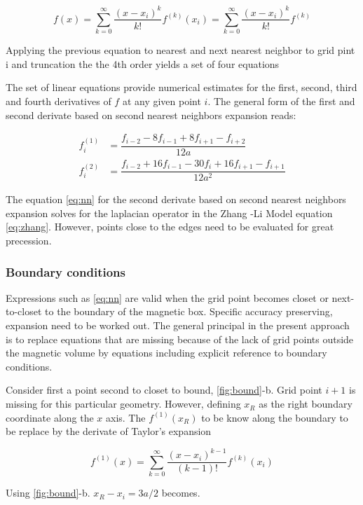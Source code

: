 $$f(x) = \sum\limits_{k=0}^{\infty} \dfrac{(x-x_i)^k}{k!}f^{(k)}(x_i) = \sum\limits_{k=0}^{\infty} \dfrac{(x-x_i)^k}{k!}f^{(k)}$$

Applying the previous equation to nearest and next nearest neighbor to grid pint i and truncation the the 4th order yields a set of four equations

The set of linear equations provide numerical estimates for the first, second, third and fourth derivatives of $f$ at any given point $i$. The general form of the first and second derivate based on second nearest neighbors expansion reads:

\begin{align} \label{eq:nn}
f^{(1)}_i &= \dfrac{f_{i-2}-8f_{i-1} + 8f_{i+1} - f_{i+2}}{12a} \\
f^{(2)}_i &= \dfrac{f_{i-2}+16f_{i-1} -30f_{i} + 16f_{i+1} - f_{i+1}}{12a^2}
\end{align}

The equation \ref{eq:nn} for the second derivate based on second nearest neighbors expansion solves for the laplacian operator in the Zhang -Li Model equation \ref{eq:zhang}. However, points close to the edges need to be evaluated for great precession. 

\subsubsection{Boundary conditions}

Expressions such as \ref{eq:nn} are valid when the grid point becomes closet or next-to-closet to the boundary of the magnetic box. Specific accuracy preserving, expansion need to be worked out. The general principal in the present approach is to replace equations that are missing because of the lack of grid points outside the magnetic volume by equations including explicit reference to boundary conditions. \cite{methods}

Consider first a point second to closet to bound, \ref{fig:bound}-b. Grid point $i + 1$ is missing for this particular geometry. However, defining $x_R$ as the right boundary coordinate along the $x$ axis. The $f^{(1)}(x_R)$ to be know along the boundary to be replace by the derivate of Taylor's expansion

\begin{equation} \label{eq:taylor}
f^{(1)}(x) = \sum\limits_{k=0}^{\infty} \dfrac{(x-x_i)^{k-1}}{(k - 1)!}f^{(k)}(x_i)
\end{equation}

Using \ref{fig:bound}-b. $x_R - x_i = 3a/2$ becomes.

